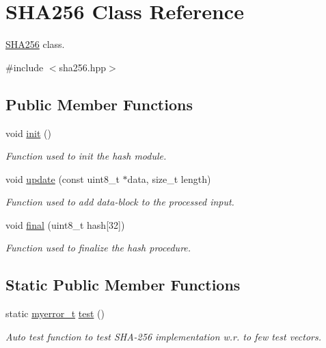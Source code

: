 \hypertarget{classSHA256}{}\section{S\+H\+A256 Class Reference}
\label{classSHA256}


\hyperlink{classSHA256}{S\+H\+A256} class.  




{\ttfamily \#include $<$sha256.\+hpp$>$}

\subsection*{Public Member Functions}
\begin{DoxyCompactItemize}
\item 
void \hyperlink{classSHA256_a9893152e0b8a75ebed254509dfb1eb4a}{init} ()
\begin{DoxyCompactList}\small\item\em Function used to init the hash module. \end{DoxyCompactList}\item 
void \hyperlink{classSHA256_ad8fd8e1bb7747817dc3f66207cf93bb1}{update} (const uint8\+\_\+t $\ast$data, size\+\_\+t length)
\begin{DoxyCompactList}\small\item\em Function used to add data-\/block to the processed input. \end{DoxyCompactList}\item 
void \hyperlink{classSHA256_ae18db29e29d9596d3f88299ddd839efa}{final} (uint8\+\_\+t hash\mbox{[}32\mbox{]})
\begin{DoxyCompactList}\small\item\em Function used to finalize the hash procedure. \end{DoxyCompactList}\end{DoxyCompactItemize}
\subsection*{Static Public Member Functions}
\begin{DoxyCompactItemize}
\item 
static \hyperlink{error_8hpp_acabd2917084445509becf54ab64a4bd0}{myerror\+\_\+t} \hyperlink{classSHA256_a5560241abd7bc47ada8fa6a8749a5de8}{test} ()
\begin{DoxyCompactList}\small\item\em Auto test function to test S\+H\+A-\/256 implementation w.\+r. to few test vectors. \end{DoxyCompactList}\end{DoxyCompactItemize}
